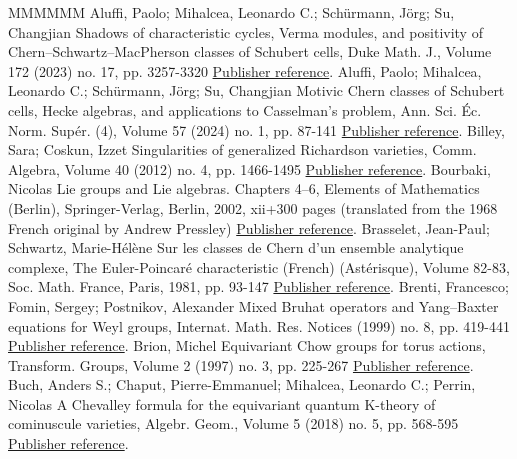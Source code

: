 \documentclass[11pt]{article}
\theoremstyle{definition}
\numberwithin{equation}{section}
\begin{document}
\begin{thebibliography}{MMMMMM}
 Aluffi, Paolo; Mihalcea, Leonardo C.; Schürmann, Jörg; Su, Changjian Shadows of characteristic cycles, Verma modules, and positivity of Chern–Schwartz–MacPherson classes of Schubert cells, Duke Math. J., Volume 172 (2023) no. 17, pp. 3257-3320 \href{https://alco.centre-mersenne.org/articles/10.5802/alco.428/#AMSS:shadows}{Publisher reference}.
 Aluffi, Paolo; Mihalcea, Leonardo C.; Schürmann, Jörg; Su, Changjian Motivic Chern classes of Schubert cells, Hecke algebras, and applications to Casselman’s problem, Ann. Sci. Éc. Norm. Supér. (4), Volume 57 (2024) no. 1, pp. 87-141 \href{https://alco.centre-mersenne.org/articles/10.5802/alco.428/#AMSS:motivic}{Publisher reference}.
 Billey, Sara; Coskun, Izzet Singularities of generalized Richardson varieties, Comm. Algebra, Volume 40 (2012) no. 4, pp. 1466-1495 \href{https://alco.centre-mersenne.org/articles/10.5802/alco.428/#billey.coskun:singularities}{Publisher reference}.
 Bourbaki, Nicolas Lie groups and Lie algebras. Chapters 4–6, Elements of Mathematics (Berlin), Springer-Verlag, Berlin, 2002, xii+300 pages (translated from the 1968 French original by Andrew Pressley) \href{https://alco.centre-mersenne.org/articles/10.5802/alco.428/#bourbaki:Lie4-6}{Publisher reference}.
 Brasselet, Jean-Paul; Schwartz, Marie-Hélène Sur les classes de Chern d’un ensemble analytique complexe, The Euler-Poincaré characteristic (French) (Astérisque), Volume 82-83, Soc. Math. France, Paris, 1981, pp. 93-147 \href{https://alco.centre-mersenne.org/articles/10.5802/alco.428/#BS81}{Publisher reference}.
 Brenti, Francesco; Fomin, Sergey; Postnikov, Alexander Mixed Bruhat operators and Yang–Baxter equations for Weyl groups, Internat. Math. Res. Notices (1999) no. 8, pp. 419-441 \href{https://alco.centre-mersenne.org/articles/10.5802/alco.428/#BFP99}{Publisher reference}.
 Brion, Michel Equivariant Chow groups for torus actions, Transform. Groups, Volume 2 (1997) no. 3, pp. 225-267 \href{https://alco.centre-mersenne.org/articles/10.5802/alco.428/#brion:eq-chow}{Publisher reference}.
 Buch, Anders S.; Chaput, Pierre-Emmanuel; Mihalcea, Leonardo C.; Perrin, Nicolas A Chevalley formula for the equivariant quantum K-theory of cominuscule varieties, Algebr. Geom., Volume 5 (2018) no. 5, pp. 568-595 \href{https://alco.centre-mersenne.org/articles/10.5802/alco.428/#BCMP:QKChev}{Publisher reference}.

\end{thebibliography}
\end{document}
